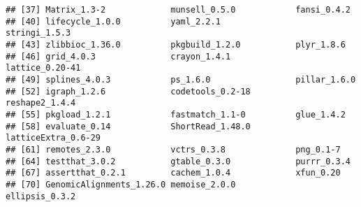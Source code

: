 \documentclass[
]{article}
\begin{document}
\begin{verbatim}
## [37] Matrix_1.3-2             munsell_0.5.0            fansi_0.4.2             
## [40] lifecycle_1.0.0          yaml_2.2.1               stringi_1.5.3           
## [43] zlibbioc_1.36.0          pkgbuild_1.2.0           plyr_1.8.6              
## [46] grid_4.0.3               crayon_1.4.1             lattice_0.20-41         
## [49] splines_4.0.3            ps_1.6.0                 pillar_1.6.0            
## [52] igraph_1.2.6             codetools_0.2-18         reshape2_1.4.4          
## [55] pkgload_1.2.1            fastmatch_1.1-0          glue_1.4.2              
## [58] evaluate_0.14            ShortRead_1.48.0         latticeExtra_0.6-29     
## [61] remotes_2.3.0            vctrs_0.3.8              png_0.1-7               
## [64] testthat_3.0.2           gtable_0.3.0             purrr_0.3.4             
## [67] assertthat_0.2.1         cachem_1.0.4             xfun_0.20               
## [70] GenomicAlignments_1.26.0 memoise_2.0.0            ellipsis_0.3.2
\end{verbatim}
\end{document}
